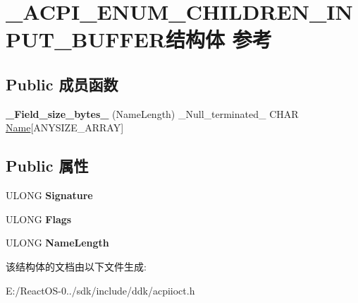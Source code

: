 \hypertarget{struct___a_c_p_i___e_n_u_m___c_h_i_l_d_r_e_n___i_n_p_u_t___b_u_f_f_e_r}{}\section{\+\_\+\+A\+C\+P\+I\+\_\+\+E\+N\+U\+M\+\_\+\+C\+H\+I\+L\+D\+R\+E\+N\+\_\+\+I\+N\+P\+U\+T\+\_\+\+B\+U\+F\+F\+E\+R结构体 参考}
\label{struct___a_c_p_i___e_n_u_m___c_h_i_l_d_r_e_n___i_n_p_u_t___b_u_f_f_e_r}
\subsection*{Public 成员函数}
\begin{DoxyCompactItemize}
\item 
\mbox{\label{struct___a_c_p_i___e_n_u_m___c_h_i_l_d_r_e_n___i_n_p_u_t___b_u_f_f_e_r_a2121d5912565b3f5749bac3ad6413d08}} 
{\bfseries \+\_\+\+Field\+\_\+size\+\_\+bytes\+\_\+} (Name\+Length) \+\_\+\+Null\+\_\+terminated\+\_\+ C\+H\+AR \hyperlink{struct_name_rec__}{Name}\mbox{[}A\+N\+Y\+S\+I\+Z\+E\+\_\+\+A\+R\+R\+AY\mbox{]}
\end{DoxyCompactItemize}
\subsection*{Public 属性}
\begin{DoxyCompactItemize}
\item 
\mbox{\label{struct___a_c_p_i___e_n_u_m___c_h_i_l_d_r_e_n___i_n_p_u_t___b_u_f_f_e_r_a3737ff19819555876ed50799e31b16f9}} 
U\+L\+O\+NG {\bfseries Signature}
\item 
\mbox{\label{struct___a_c_p_i___e_n_u_m___c_h_i_l_d_r_e_n___i_n_p_u_t___b_u_f_f_e_r_ac945f51310320148e2b37ff1f725e2a6}} 
U\+L\+O\+NG {\bfseries Flags}
\item 
\mbox{\label{struct___a_c_p_i___e_n_u_m___c_h_i_l_d_r_e_n___i_n_p_u_t___b_u_f_f_e_r_a2ce7396726ec924b028ce31091a70139}} 
U\+L\+O\+NG {\bfseries Name\+Length}
\end{DoxyCompactItemize}


该结构体的文档由以下文件生成\+:\begin{DoxyCompactItemize}
\item 
E\+:/\+React\+O\+S-\/0../sdk/include/ddk/acpiioct.\+h\end{DoxyCompactItemize}
